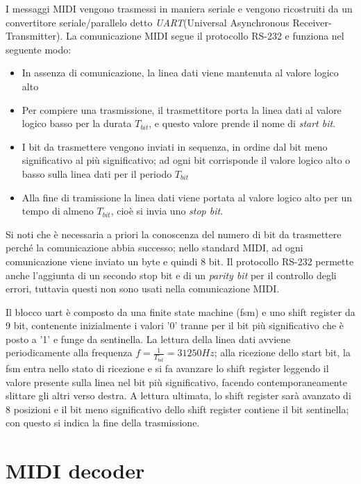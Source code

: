 I messaggi MIDI vengono trasmessi in maniera seriale e vengono ricostruiti da un convertitore seriale/parallelo detto \textit{UART}(Universal Asynchronous Receiver-Transmitter).
La comunicazione MIDI segue il protocollo RS-232 e funziona nel seguente modo:
\begin{itemize}
	\item In assenza di comunicazione, la linea dati viene mantenuta al valore logico alto
	\item Per compiere una trasmissione, il trasmettitore porta la linea dati al valore logico basso per la durata $T_{bit}$, e questo valore prende il nome di \textit{start bit}.
	\item I bit da trasmettere vengono inviati in sequenza, in ordine dal bit meno significativo al più significativo; ad ogni bit corrisponde il valore logico alto o basso sulla linea dati per il periodo $T_{bit}$
	\item Alla fine di tramissione la linea dati viene portata al valore logico alto per un tempo di almeno $T_{bit}$, cioè si invia uno \textit{stop bit}.
\end{itemize}
Si noti che è necessaria a priori la conoscenza del numero di bit da trasmettere perché la comunicazione abbia successo; nello standard MIDI, ad ogni comunicazione viene inviato un byte e quindi 8 bit.
Il protocollo RS-232 permette anche l'aggiunta di un secondo stop bit e di un \textit{parity bit} per il controllo degli errori, tuttavia questi non sono usati nella comunicazione MIDI.

Il blocco uart è composto da una finite state machine (fsm) e uno shift register da 9 bit, contenente inizialmente i valori '0' tranne per il bit più significativo che è posto a '1' e funge da sentinella. La lettura della linea dati avviene periodicamente alla frequenza $f = \frac{1}{T_{bit}} = 31250 \si{Hz}$; alla ricezione dello start bit, la fsm entra nello stato di ricezione e si fa avanzare lo shift register leggendo il valore presente sulla linea nel bit più significativo, facendo contemporaneamente slittare gli altri verso destra.
A lettura ultimata, lo shift register sarà avanzato di 8 posizioni e il bit meno significativo dello shift register contiene il bit sentinella; con questo si indica la fine della trasmissione.

\section{MIDI decoder}
\label{sec:mididec}

